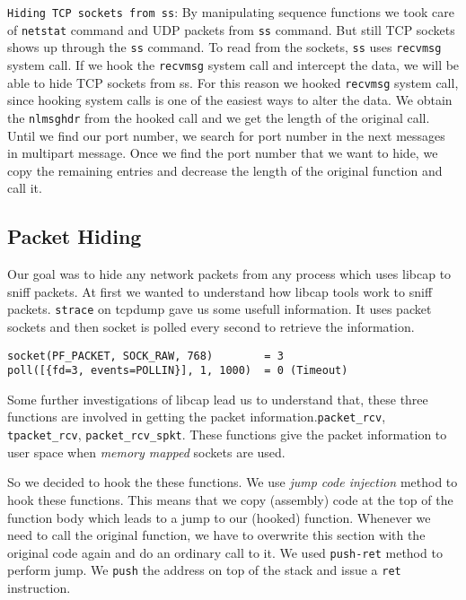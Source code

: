 \documentclass[10pt, letterpaper]{scrartcl}
\begin{document}
\texttt{Hiding TCP sockets from ss}: By manipulating sequence functions we took care of \texttt{netstat} 
command and UDP packets from \texttt{ss} command. But still TCP sockets shows up through the \texttt{ss} command.
To read from the sockets, \texttt{ss} uses \texttt{recvmsg} system call. 
If we hook the \texttt{recvmsg} system call and intercept the data, we will be able to hide TCP sockets from ss. 
For this reason we hooked \texttt{recvmsg} system call, 
since hooking system calls is one of the easiest ways to alter the data.
We obtain the \texttt{nlmsghdr} from the hooked call and we get the length of the original call.
Until we find our port number, we search for port number in the next messages in multipart message. 
Once we find the port number that we want to hide, 
we copy the remaining entries and decrease the length of the original function and call it.


\subsection{Packet Hiding}
Our goal was to hide any network packets from any process which uses libcap to  sniff packets.
At first we wanted to understand how libcap tools work to sniff packets. \texttt{strace} on tcpdump gave us some usefull information. It uses packet sockets and then socket is polled every second to retrieve the information.   

\begin{verbatim}
socket(PF_PACKET, SOCK_RAW, 768)        = 3
poll([{fd=3, events=POLLIN}], 1, 1000)  = 0 (Timeout)
\end{verbatim} 

Some further investigations of libcap lead us to understand that, these three functions are involved in getting the packet information.\texttt{packet\_rcv}, \texttt{tpacket\_rcv}, \texttt{packet\_rcv\_spkt}. These functions give the packet information to user space when {\em memory mapped} sockets are used.

So we decided to hook the these functions. 
We use {\em jump code injection} method to hook these functions. This means that we copy (assembly)
code at the top of the function body which leads to a jump to our (hooked) function. Whenever we need to call
the original function, we have to overwrite this section with the original code again and do an ordinary call to
it. We used \texttt{push-ret} method to perform jump. 
We \texttt{push} the address on top of the stack and issue a \texttt{ret} instruction.
\end{document}
